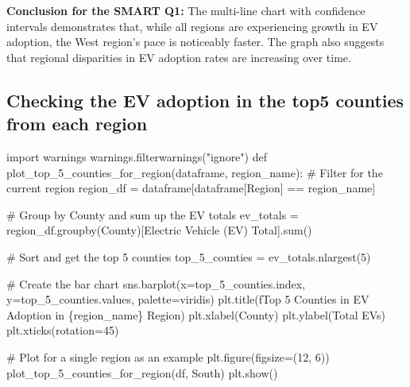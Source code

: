 \documentclass[
  letterpaper,
  DIV=11,
  numbers=noendperiod]{scrartcl}
\newenvironment{Shaded}{\begin{snugshade}}{\end{snugshade}}
\newcommand{\BuiltInTok}[1]{\textcolor[rgb]{0.00,0.23,0.31}{#1}}
\newcommand{\CommentTok}[1]{\textcolor[rgb]{0.37,0.37,0.37}{#1}}
\newcommand{\DecValTok}[1]{\textcolor[rgb]{0.68,0.00,0.00}{#1}}
\newcommand{\ImportTok}[1]{\textcolor[rgb]{0.00,0.46,0.62}{#1}}
\newcommand{\KeywordTok}[1]{\textcolor[rgb]{0.00,0.23,0.31}{#1}}
\newcommand{\NormalTok}[1]{\textcolor[rgb]{0.00,0.23,0.31}{#1}}
\newcommand{\OperatorTok}[1]{\textcolor[rgb]{0.37,0.37,0.37}{#1}}
\newcommand{\SpecialCharTok}[1]{\textcolor[rgb]{0.37,0.37,0.37}{#1}}
\newcommand{\SpecialStringTok}[1]{\textcolor[rgb]{0.13,0.47,0.30}{#1}}
\newcommand{\StringTok}[1]{\textcolor[rgb]{0.13,0.47,0.30}{#1}}
\begin{document}
\textbf{Conclusion for the SMART Q1:} The multi-line chart with
confidence intervals demonstrates that, while all regions are
experiencing growth in EV adoption, the West region's pace is noticeably
faster. The graph also suggests that regional disparities in EV adoption
rates are increasing over time.

\hypertarget{checking-the-ev-adoption-in-the-top5-counties-from-each-region}{%
\subsection{Checking the EV adoption in the top5 counties from each
region}\label{checking-the-ev-adoption-in-the-top5-counties-from-each-region}}

\begin{Shaded}
\begin{Highlighting}[]
\ImportTok{import}\NormalTok{ warnings}
\NormalTok{warnings.filterwarnings(}\StringTok{"ignore"}\NormalTok{)}
\KeywordTok{def}\NormalTok{ plot\_top\_5\_counties\_for\_region(dataframe, region\_name):}
    \CommentTok{\# Filter for the current region}
\NormalTok{    region\_df }\OperatorTok{=}\NormalTok{ dataframe[dataframe[}\StringTok{\textquotesingle{}Region\textquotesingle{}}\NormalTok{] }\OperatorTok{==}\NormalTok{ region\_name]}

    \CommentTok{\# Group by \textquotesingle{}County\textquotesingle{} and sum up the EV totals}
\NormalTok{    ev\_totals }\OperatorTok{=}\NormalTok{ region\_df.groupby(}\StringTok{\textquotesingle{}County\textquotesingle{}}\NormalTok{)[}\StringTok{\textquotesingle{}Electric Vehicle (EV) Total\textquotesingle{}}\NormalTok{].}\BuiltInTok{sum}\NormalTok{()}

    \CommentTok{\# Sort and get the top 5 counties}
\NormalTok{    top\_5\_counties }\OperatorTok{=}\NormalTok{ ev\_totals.nlargest(}\DecValTok{5}\NormalTok{)}

    \CommentTok{\# Create the bar chart}
\NormalTok{    sns.barplot(x}\OperatorTok{=}\NormalTok{top\_5\_counties.index, y}\OperatorTok{=}\NormalTok{top\_5\_counties.values, palette}\OperatorTok{=}\StringTok{\textquotesingle{}viridis\textquotesingle{}}\NormalTok{)}
\NormalTok{    plt.title(}\SpecialStringTok{f\textquotesingle{}Top 5 Counties in EV Adoption in }\SpecialCharTok{\{}\NormalTok{region\_name}\SpecialCharTok{\}}\SpecialStringTok{ Region\textquotesingle{}}\NormalTok{)}
\NormalTok{    plt.xlabel(}\StringTok{\textquotesingle{}County\textquotesingle{}}\NormalTok{)}
\NormalTok{    plt.ylabel(}\StringTok{\textquotesingle{}Total EVs\textquotesingle{}}\NormalTok{)}
\NormalTok{    plt.xticks(rotation}\OperatorTok{=}\DecValTok{45}\NormalTok{)}

\CommentTok{\# Plot for a single region as an example}
\NormalTok{plt.figure(figsize}\OperatorTok{=}\NormalTok{(}\DecValTok{12}\NormalTok{, }\DecValTok{6}\NormalTok{))}
\NormalTok{plot\_top\_5\_counties\_for\_region(df, }\StringTok{\textquotesingle{}South\textquotesingle{}}\NormalTok{)}
\NormalTok{plt.show()}
\end{Highlighting}
\end{Shaded}
\end{document}
